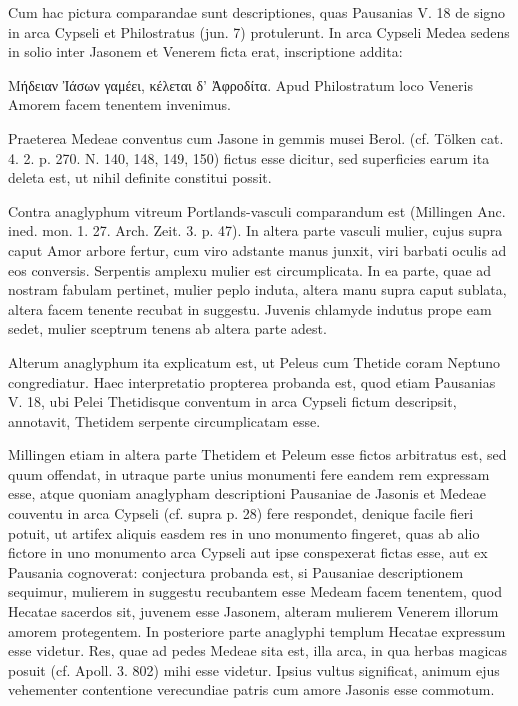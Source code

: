 \documentclass[a4paper, 11pt, oneside, polutonikogreek, german]{article}
\begin{document}
Cum hac pictura comparandae sunt descriptiones, quas Pausanias V. 18 de signo in arca Cypseli et Philostratus (jun. 7) protulerunt. In arca Cypseli Medea sedens in solio inter Jasonem et Venerem ficta erat, inscriptione addita:

Μήδειαν Ἰάσων γαμέει, κέλεται δ' Ἀφροδίτα. Apud Philostratum loco Veneris Amorem facem tenentem invenimus.

Praeterea Medeae conventus cum Jasone in gemmis musei Berol. (cf. Tölken cat. 4. 2. p. 270. N. 140, 148, 149, 150) fictus esse dicitur, sed superficies earum ita deleta est, ut nihil definite constitui possit.

Contra anaglyphum vitreum Portlands-vasculi comparandum est (Millingen Anc. ined. mon. 1. 27. Arch. Zeit. 3. p. 47). In altera parte vasculi mulier, cujus supra caput Amor arbore fertur, cum viro adstante manus junxit, viri barbati oculis ad eos conversis. Serpentis amplexu mulier est circumplicata. In ea parte, quae ad nostram fabulam pertinet, mulier peplo induta, altera manu supra caput sublata, altera facem tenente recubat in suggestu. Juvenis chlamyde indutus prope eam sedet, mulier sceptrum tenens ab altera parte adest.

Alterum anaglyphum ita explicatum est, ut Peleus cum Thetide coram Neptuno congrediatur. Haec interpretatio propterea probanda est, quod etiam Pausanias V. 18, ubi Pelei Thetidisque conventum in arca Cypseli fictum descripsit, annotavit, Thetidem serpente circumplicatam esse.

Millingen etiam in altera parte Thetidem et Peleum esse fictos arbitratus est, sed quum offendat, in utraque parte unius monumenti fere eandem rem expressam esse, atque quoniam anaglypham descriptioni Pausaniae de Jasonis et Medeae couventu in arca Cypseli (cf. supra p. 28) fere respondet, denique facile fieri potuit, ut artifex aliquis easdem res in uno monumento fingeret, quas ab alio fictore in uno monumento arca Cypseli aut ipse conspexerat fictas esse, aut ex Pausania cognoverat: conjectura probanda est, si Pausaniae descriptionem sequimur, mulierem in suggestu recubantem esse Medeam facem tenentem, quod Hecatae sacerdos sit, juvenem esse Jasonem, alteram mulierem Venerem illorum amorem protegentem. In posteriore parte anaglyphi templum Hecatae expressum esse videtur. Res, quae ad pedes Medeae sita est, illa arca, in qua herbas magicas posuit (cf. Apoll. 3. 802) mihi esse videtur. Ipsius vultus significat, animum ejus vehementer contentione verecundiae patris cum amore Jasonis esse commotum.
\end{document}
